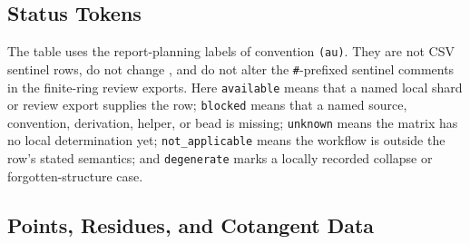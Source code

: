 \subsection{Status Tokens}

The table uses the report-planning labels of convention \texttt{(au)}.  They
are not CSV sentinel rows, do not change , and do not
alter the \texttt{\#}-prefixed sentinel comments in the finite-ring review
exports.  Here \texttt{available} means that a named local shard or review
export supplies the row; \texttt{blocked} means that a named source,
convention, derivation, helper, or bead is missing; \texttt{unknown} means the
matrix has no local determination yet; \texttt{not\_applicable} means the
workflow is outside the row's stated semantics; and \texttt{degenerate} marks
a locally recorded collapse or forgotten-structure case.

\subsection{Points, Residues, and Cotangent Data}

